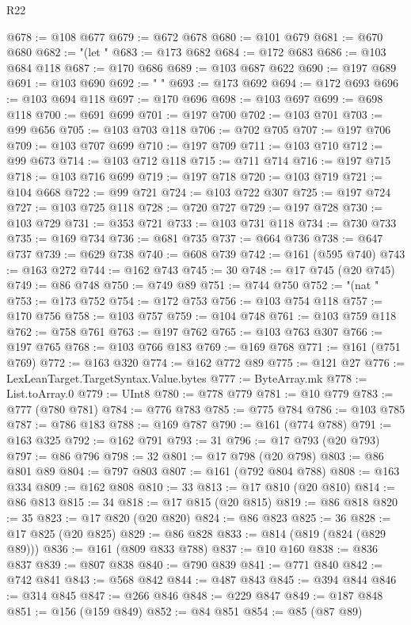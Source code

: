 \begin{lexlean}{R22}
\begin{coremodule}
{{{{{{{{{{{{{{{{{{{{{{{{{{{{{{{{{{{{{{{{{{{{{{{{{{{{@678 := @108 @677
@679 := @672 @678
@680 := @101 @679
@681 := @670 @680
@682 := "(let "
@683 := @173 @682
@684 := @172 @683
@686 := @103 @684 @118
@687 := @170 @686
@689 := @103 @687 @622
@690 := @197 @689
@691 := @103 @690
@692 := " "
@693 := @173 @692
@694 := @172 @693
@696 := @103 @694 @118
@697 := @170 @696
@698 := @103 @697
@699 := @698 @118
@700 := @691 @699
@701 := @197 @700
@702 := @103 @701
@703 := @99 @656
@705 := @103 @703 @118
@706 := @702 @705
@707 := @197 @706
@709 := @103 @707 @699
@710 := @197 @709
@711 := @103 @710
@712 := @99 @673
@714 := @103 @712 @118
@715 := @711 @714
@716 := @197 @715
@718 := @103 @716 @699
@719 := @197 @718
@720 := @103 @719
@721 := @104 @668
@722 := @99 @721
@724 := @103 @722 @307
@725 := @197 @724
@727 := @103 @725 @118
@728 := @720 @727
@729 := @197 @728
@730 := @103 @729
@731 := @353 @721
@733 := @103 @731 @118
@734 := @730 @733
@735 := @169 @734
@736 := @681 @735
@737 := @664 @736
@738 := @647 @737
@739 := @629 @738
@740 := @608 @739
@742 := @161 (@595 @740)
@743 := @163 @272
@744 := @162 @743
@745 := 30
@748 := @17 @745 (@20 @745)
@749 := @86 @748
@750 := @749 @89
@751 := @744 @750
@752 := "(nat "
@753 := @173 @752
@754 := @172 @753
@756 := @103 @754 @118
@757 := @170 @756
@758 := @103 @757
@759 := @104 @748
@761 := @103 @759 @118
@762 := @758 @761
@763 := @197 @762
@765 := @103 @763 @307
@766 := @197 @765
@768 := @103 @766 @183
@769 := @169 @768
@771 := @161 (@751 @769)
@772 := @163 @320
@774 := @162 @772 @89
@775 := @121 @27
@776 := LexLeanTarget.TargetSyntax.Value.bytes
@777 := ByteArray.mk
@778 := List.toArray.{0}
@779 := UInt8
@780 := @778 @779
@781 := @10 @779
@783 := @777 (@780 @781)
@784 := @776 @783
@785 := @775 @784
@786 := @103 @785
@787 := @786 @183
@788 := @169 @787
@790 := @161 (@774 @788)
@791 := @163 @325
@792 := @162 @791
@793 := 31
@796 := @17 @793 (@20 @793)
@797 := @86 @796
@798 := 32
@801 := @17 @798 (@20 @798)
@803 := @86 @801 @89
@804 := @797 @803
@807 := @161 (@792 @804 @788)
@808 := @163 @334
@809 := @162 @808
@810 := 33
@813 := @17 @810 (@20 @810)
@814 := @86 @813
@815 := 34
@818 := @17 @815 (@20 @815)
@819 := @86 @818
@820 := 35
@823 := @17 @820 (@20 @820)
@824 := @86 @823
@825 := 36
@828 := @17 @825 (@20 @825)
@829 := @86 @828
@833 := @814 (@819 (@824 (@829 @89)))
@836 := @161 (@809 @833 @788)
@837 := @10 @160
@838 := @836 @837
@839 := @807 @838
@840 := @790 @839
@841 := @771 @840
@842 := @742 @841
@843 := @568 @842
@844 := @487 @843
@845 := @394 @844
@846 := @314 @845
@847 := @266 @846
@848 := @229 @847
@849 := @187 @848
@851 := @156 (@159 @849)
@852 := @84 @851
@854 := @85 (@87 @89)
}}}}}}}}}}}}}}}}}}}}}}}}}}}}}}}}}}}}}}}}}}}}}}}}}}}}
\end{coremodule}
\end{lexlean}
